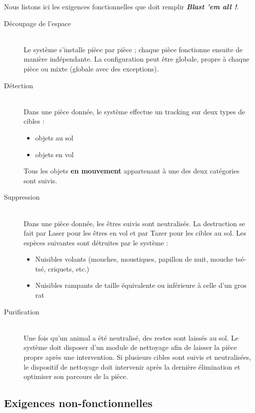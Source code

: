 Nous listons ici les exigences fonctionnelles que doit remplir 
\textit{\textbf{Blast 'em all !}}.
\begin{description}
\item[Découpage de l'espace]\hfill\\
Le système s'installe pièce par pièce ; chaque pièce fonctionne ensuite de
manière indépendante. La configuration peut être globale, propre à chaque
pièce ou mixte (globale avec des exceptions).

\item[Détection]\hfill\\
Dans une pièce donnée, le système effectue un tracking sur deux types de
cibles :
    \begin{itemize}
    \item objets au sol
    \item objets en vol
    \end{itemize}
    \vskip 6pt
Tous les objets	\textbf{en mouvement} appartenant à une des deux catégories sont
suivis. 

\item[Suppression]\hfill\\
Dans une pièce donnée, les êtres suivis sont neutralisés. La destruction 
se fait par Laser pour les êtres en vol et par Tazer pour les cibles au
sol. Les espèces suivantes sont détruites par le système :
    \begin{itemize}
    \item Nuisibles volants (mouches, moustiques, papillon de nuit, mouche
    tsé-tsé, criquets, etc.)
    \item Nuisibles rampants de taille équivalente ou inférieure à celle
    d'un gros rat
    \end{itemize}
    \vskip 6pt

\item[Purification]\hfill\\
Une fois qu'un animal a été neutralisé, des restes sont laissés au sol. Le
système doit disposer d'un module de nettoyage afin de laisser la pièce
propre après une intervention. Si plusieurs cibles sont suivis et
neutralisées, le dispositif de nettoyage doit intervenir après la dernière
élimination et optimiser son parcours de la pièce.
\end{description}

\subsection{Exigences non-fonctionnelles}

